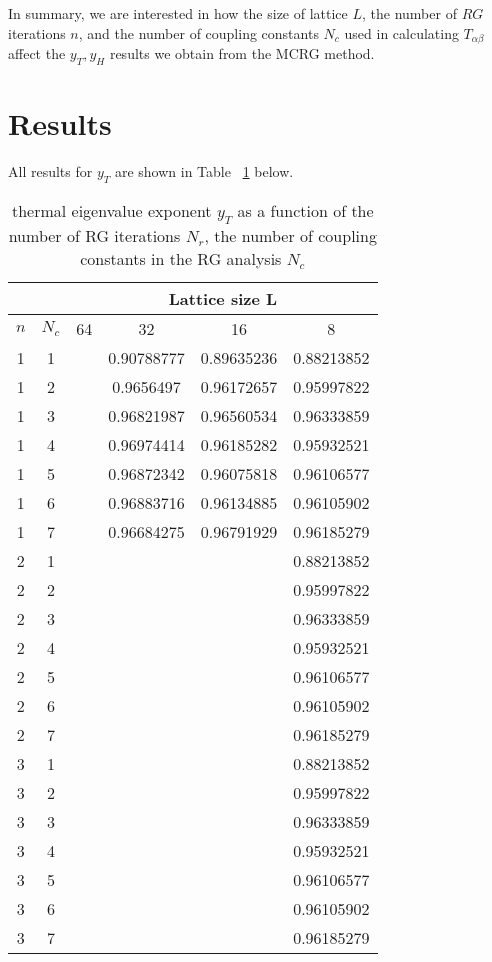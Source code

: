 \documentclass{article}
\begin{document}
In summary, we are interested in how the size of lattice $L$, the number of $RG$ iterations $n$, and the number of coupling constants $N_c$ used in calculating $T_{\alpha\beta}$ affect the $y_T, y_H$ results we obtain from the MCRG method.

\section{Results}
All results for $y_T$ are shown in Table ~\ref{yT} below.
\begin{table}[H]
\centering
\begin{tabular}{|c|c|c|c|c|c|} 
\hline
 \multicolumn{2}{|c|}{ }& \multicolumn{4}{c|}{Lattice size L}\\
 \hline
 $n$ & $N_c$ & 64 & 32 & 16 & 8 \\
 \hline
 1 & 1 & & 0.90788777& 0.89635236 & 0.88213852\\
 1 & 2 & & 0.9656497 & 0.96172657 & 0.95997822\\
 1 & 3 & & 0.96821987& 0.96560534 & 0.96333859\\
 1 & 4 & & 0.96974414 & 0.96185282 & 0.95932521\\
 1 & 5 & & 0.96872342 & 0.96075818 & 0.96106577\\
 1 & 6 & & 0.96883716 & 0.96134885 & 0.96105902\\
 1 & 7 & & 0.96684275 & 0.96791929 & 0.96185279\\
 \hline
 2 & 1 & & & & 0.88213852\\
 2 & 2 & & & & 0.95997822\\
 2 & 3 & & & & 0.96333859\\
 2 & 4 & & & & 0.95932521\\
 2 & 5 & & & & 0.96106577\\
 2 & 6 & & & & 0.96105902\\
 2 & 7 & & & & 0.96185279\\
 \hline
 3 & 1 & & & & 0.88213852\\
 3 & 2 & & & & 0.95997822\\
 3 & 3 & & & & 0.96333859\\
 3 & 4 & & & & 0.95932521\\
 3 & 5 & & & & 0.96106577\\
 3 & 6 & & & & 0.96105902\\
 3 & 7 & & & & 0.96185279\\
 \hline
 \end{tabular}
 \caption{\label{yT}thermal eigenvalue
exponent $y_T$ as a function of the number of RG iterations $N_r$, the number of coupling
constants in the RG analysis $N_c$}
\end{table}
\end{document}
